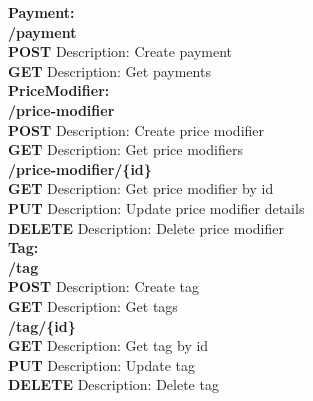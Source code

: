 \documentclass[11pt,a4paper,pdftex]{article}
\begin{document}
\textbf{Payment:}\\
\hspace*{1em}\textbf{/payment}\\
\hspace*{2em}\textbf{POST} Description: Create payment\\
\hspace*{2em}\textbf{GET} Description: Get payments\\



\textbf{PriceModifier:}\\
\hspace*{1em}\textbf{/price-modifier}\\
\hspace*{2em}\textbf{POST} Description: Create price modifier\\
\hspace*{2em}\textbf{GET} Description: Get price modifiers\\

\hspace*{1em}\textbf{/price-modifier/\{\textbf{id}\}}\\
\hspace*{2em}\textbf{GET} Description: Get price modifier by id\\
\hspace*{2em}\textbf{PUT} Description: Update price modifier details\\
\hspace*{2em}\textbf{DELETE} Description: Delete price modifier\\


\textbf{Tag:}\\
\hspace*{1em}\textbf{/tag}\\
\hspace*{2em}\textbf{POST} Description: Create tag\\
\hspace*{2em}\textbf{GET} Description: Get tags\\

\hspace*{1em}\textbf{/tag/\{\textbf{id}\}}\\
\hspace*{2em}\textbf{GET} Description: Get tag by id\\
\hspace*{2em}\textbf{PUT} Description: Update tag\\
\hspace*{2em}\textbf{DELETE} Description: Delete tag\\
\end{document}
